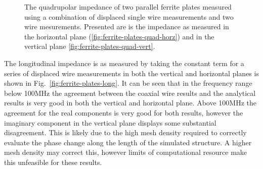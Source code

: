 \begin{figure}
\label{fig:ferrite-plates-quadrupolar}
\caption{The quadrupolar impedance of two parallel ferrite plates measured using a combination of displaced single wire measurements and two wire mesurements. Presented are is the impedance as measured in the horizontal plane (\ref{fig:ferrite-plates-quad-horz}) and in the vertical plane \ref{fig:ferrite-plates-quad-vert}.}
\end{figure}

The longitudinal impedance is as measured by taking the constant term for a series of displaced wire measurements in both the vertical and horizontal planes is shown in Fig.~\ref{fig:ferrite-plates-long}. It can be seen that in the frequency range below 100MHz the agreement between the coaxial wire results and the analytical results is very good in both the vertical and horizontal plane. Above 100MHz the agreement for the real components is very good for both results, however the imaginary component in the vertical plane displays some substantial disagreement. This is likely due to the high mesh density required to correctly evaluate the phase change along the length of the simulated structure. A higher mesh density may correct this, however limits of computational resource make this unfeasible for these results.

